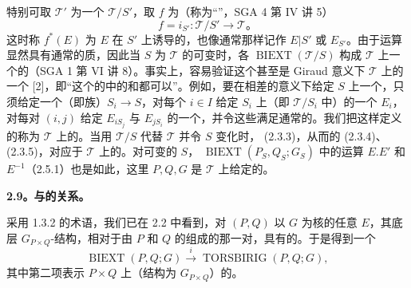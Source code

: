 特别可取 $\mathcal T'$ 为一个 $\mathcal T/S'$，取 $f$ 为（称为“”，SGA 4 第 IV 讲 5）
\[
f=i_{S'}:\mathcal T/S'\longrightarrow\mathcal T。
\]
这时称 $f^*(E)$ 为 $E$ 在 $S'$ 上诱导的，也像通常那样记作 $E|S'$ 或 $E_{S'}$。由于运算显然具有通常的质，因此当 $S$ 为 $\mathcal T$ 的可变时，各 $\operatorname{BIEXT}(\mathcal T/S)$ 构成 $\mathcal T$ 上一个的（SGA 1 第 VI 讲 8）。事实上，容易验证这个甚至是 Giraud 意义下 $\mathcal T$ 上的一个 [2]，即“这个的中的和都可以”。例如，要在相差的意义下给定 $S$ 上一个，只须给定一个（即族）$S_i\to S$，对每个 $i\in I$ 给定 $S_i$ 上（即 $\mathcal T/S_i$ 中）的一个 $E_i$，对每对 $(i,j)$ 给定 $E_{iS_j}$ 与 $E_{jS_i}$ 的一个，并令这些满足通常的。我们把这样定义的称为 $\mathcal T$ 上的。当用 $\mathcal T/S$ 代替 $\mathcal T$ 并令 $S$ 变化时， (2.3.3)，从而的 (2.3.4)、(2.3.5)，对应于 $\mathcal T$ 上的。对可变的 $S$， $\operatorname{BIEXT}(P_S,Q_S;G_S)$ 中的运算 $E.E'$ 和 $E^{-1}$（2.5.1）也是如此，这里 $P,Q,G$ 是 $\mathcal T$ 上给定的。

\textbf{2.9。与的关系。}

采用 1.3.2 的术语，我们已在 2.2 中看到，对 $(P,Q)$ 以 $G$ 为核的任意 $E$，其底层 $G_{P\times Q}$-结构，相对于由 $P$ 和 $Q$ 的组成的那一对，具有的。于是得到一个
\[
\operatorname{BIEXT}(P,Q;G)\xrightarrow{i}\operatorname{TORSBIRIG}(P,Q;G),\tag{2.9.1}
\]
其中第二项表示 $P\times Q$ 上（结构为 $G_{P\times Q}$）的。

